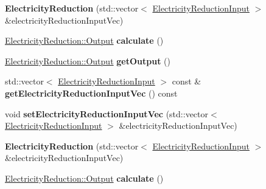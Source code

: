 \begin{DoxyCompactItemize}
\item 
\mbox{\label{class_electricity_reduction_a17a8dd763c46277fb2d30bcfc290a396}} 
{\bfseries Electricity\+Reduction} (std\+::vector$<$ \hyperlink{class_electricity_reduction_input}{Electricity\+Reduction\+Input} $>$ \&electricity\+Reduction\+Input\+Vec)
\item 
\mbox{\label{class_electricity_reduction_a3851c4fc6b81d19b05fda3f38cf17b78}} 
\hyperlink{struct_electricity_reduction_1_1_output}{Electricity\+Reduction\+::\+Output} {\bfseries calculate} ()
\item 
\mbox{\label{class_electricity_reduction_aaaef644aa2d1f92304fb5dff0dccc815}} 
\hyperlink{struct_electricity_reduction_1_1_output}{Electricity\+Reduction\+::\+Output} {\bfseries get\+Output} ()
\item 
\mbox{\label{class_electricity_reduction_a710383554d341360eaea5564473583ed}} 
std\+::vector$<$ \hyperlink{class_electricity_reduction_input}{Electricity\+Reduction\+Input} $>$ const  \& {\bfseries get\+Electricity\+Reduction\+Input\+Vec} () const
\item 
\mbox{\label{class_electricity_reduction_ab4c960d8d5b61262cdadce35681bfae6}} 
void {\bfseries set\+Electricity\+Reduction\+Input\+Vec} (std\+::vector$<$ \hyperlink{class_electricity_reduction_input}{Electricity\+Reduction\+Input} $>$ \&electricity\+Reduction\+Input\+Vec)
\item 
\mbox{\label{class_electricity_reduction_a17a8dd763c46277fb2d30bcfc290a396}} 
{\bfseries Electricity\+Reduction} (std\+::vector$<$ \hyperlink{class_electricity_reduction_input}{Electricity\+Reduction\+Input} $>$ \&electricity\+Reduction\+Input\+Vec)
\item 
\mbox{\label{class_electricity_reduction_a3851c4fc6b81d19b05fda3f38cf17b78}} 
\hyperlink{struct_electricity_reduction_1_1_output}{Electricity\+Reduction\+::\+Output} {\bfseries calculate} ()
\item 
\mbox{\label{class_electricity_reduction_aaaef644aa2d1f92304fb5dff0dccc815}} 

\end{DoxyCompactItemize}
